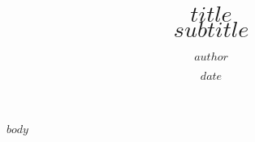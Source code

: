 \documentclass[12pt]{jarticle}
\begin{document}
\date{$date$}
\title{$title$ \\ $subtitle$}
\author{$author$}
\maketitle
$body$
\end{document}
